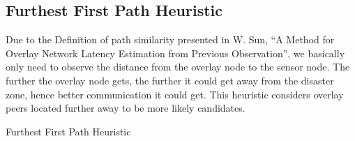 \documentclass[conference]{IEEEtran}
\begin{document}
\subsection{Furthest First Path Heuristic}
Due to the Definition of path similarity presented in W. Sun, ``A Method for Overlay Network Latency Estimation from Previous Observation'', we basically only need to observe the distance from the overlay node to the sensor node. 
The further the overlay node gets, the further it could get away from the disaster zone, hence better communication it could get. This heuristic considers overlay peers located further away to be more likely candidates.

\begin{algorithm}
\DontPrintSemicolon
{}
\SetAlgoLined
\SetAlgoLongEnd
\scriptsize
{}
\caption{Furthest First Path Heuristic}
\small
\end{algorithm}
\end{document}
